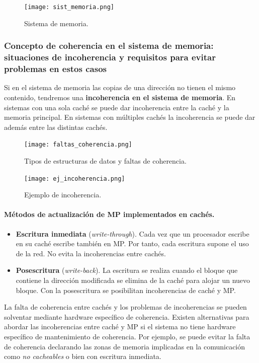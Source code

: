 \documentclass[12pt,spanish]{article}
\begin{document}
\begin{figure}[H]
\centering
\texttt{[image: sist\_memoria.png]}
\caption{Sistema de memoria.}
\end{figure}

\subsubsection{Concepto de coherencia en el sistema de memoria:  situaciones de incoherencia y requisitos para evitar problemas en estos casos}

Si en el sistema de memoria las copias de una dirección no tienen el mismo contenido, tendremos una \textbf{incoherencia en el sistema de memoria}. En sistemas con una sola caché se puede dar incoherencia entre la caché y la memoria principal. En sistemas con múltiples cachés la incoherencia se puede dar además entre las distintas cachés.

\begin{figure}[H]
\centering
\texttt{[image: faltas\_coherencia.png]}
\caption{Tipos de estructuras de datos y faltas de coherencia.}
\end{figure}

\begin{figure}[H]
\centering
\texttt{[image: ej\_incoherencia.png]}
\caption{Ejemplo de incoherencia.}
\end{figure}

\paragraph{Métodos de actualización de MP implementados en cachés.}

\begin{itemize}
	\item \textbf{Escritura inmediata} (\textit{write-through}). Cada vez que un procesador escribe en su caché escribe también en MP. Por tanto, cada escritura supone el uso de la red. No evita la incoherencias entre cachés.
	\item \textbf{Posescritura} (\textit{write-back}). La escritura se realiza cuando el bloque que contiene la dirección modificada se elimina de la caché para alojar un nuevo bloque. Con la posescritura se posibilitan incoherencias de caché y MP.
\end{itemize}

La falta de coherencia entre cachés y los problemas de incoherencias se pueden solventar mediante hardware específico de coherencia. Existen alternativas para abordar las incoherencias entre caché y MP si el sistema no tiene hardware específico de mantenimiento de coherencia. Por ejemplo, se puede evitar la falta de coherencia declarando las zonas de memoria implicadas en la comunicación como \emph{no cacheables} o bien con escritura inmediata. \\
\end{document}
